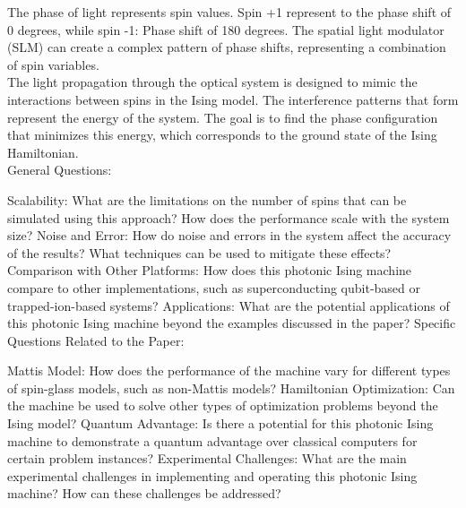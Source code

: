 The phase of light represents spin values. Spin +1 represent to the phase shift of 0 degrees, while spin -1: Phase shift of 180 degrees. The spatial light modulator (SLM) can create a complex pattern of phase shifts, representing a combination of spin variables. \\

The light propagation through the optical system is designed to mimic the interactions between spins in the Ising model. The interference patterns that form represent the energy of the system. The goal is to find the phase configuration that minimizes this energy, which corresponds to the ground state of the Ising Hamiltonian. \\


General Questions:

Scalability: What are the limitations on the number of spins that can be simulated using this approach? How does the performance scale with the system size?
Noise and Error: How do noise and errors in the system affect the accuracy of the results? What techniques can be used to mitigate these effects?
Comparison with Other Platforms: How does this photonic Ising machine compare to other implementations, such as superconducting qubit-based or trapped-ion-based systems?
Applications: What are the potential applications of this photonic Ising machine beyond the examples discussed in the paper?
Specific Questions Related to the Paper:

Mattis Model: How does the performance of the machine vary for different types of spin-glass models, such as non-Mattis models?
Hamiltonian Optimization: Can the machine be used to solve other types of optimization problems beyond the Ising model?
Quantum Advantage: Is there a potential for this photonic Ising machine to demonstrate a quantum advantage over classical computers for certain problem instances?
Experimental Challenges: What are the main experimental challenges in implementing and operating this photonic Ising machine? How can these challenges be addressed?

\newpage